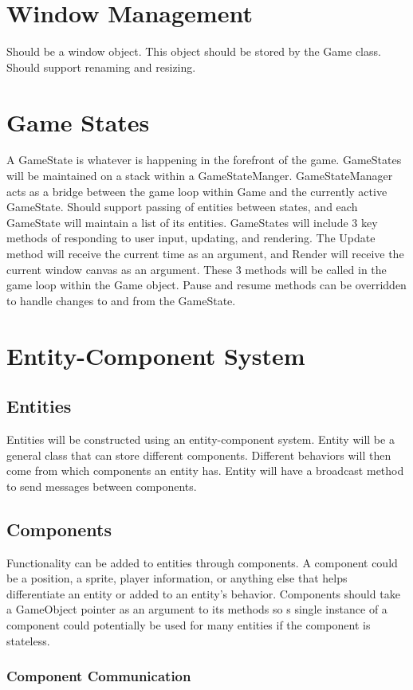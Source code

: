 \documentclass[12pt]{article}
\begin{document}
\section{Window Management}
Should be a window object.  This object should be stored by the Game class.  Should support renaming and resizing.  
	
\section{	Game States}
A GameState is whatever is happening in the forefront of the game.  GameStates will be maintained on a stack within a GameStateManger.  GameStateManager acts as a bridge between the game loop within Game and the currently active GameState.  Should support passing of entities between states, and each GameState will maintain a list of its entities.  GameStates will include 3 key methods of responding to user input, updating, and rendering.  The Update method will receive the current time as an argument, and Render will receive the current window canvas as an argument.  These 3 methods will be called in the game loop within the Game object.  Pause and resume methods can be overridden to handle changes to and from the GameState.

\section{ Entity-Component System}
\subsection{	Entities }
Entities will be constructed using an entity-component system.  Entity will be a general class that can store different components.  Different behaviors will then come from which components an entity has.  Entity will have a broadcast method to send messages between components.
\subsection{	Components }
Functionality can be added to entities through components.  A component could be a position, a sprite, player information, or anything else that helps differentiate an entity or added to an entity's behavior.  Components should take a GameObject pointer as an argument to its methods so s single instance of a component could potentially be used for many entities if the component is stateless.
\subsubsection{ Component Communication }
\end{document}
